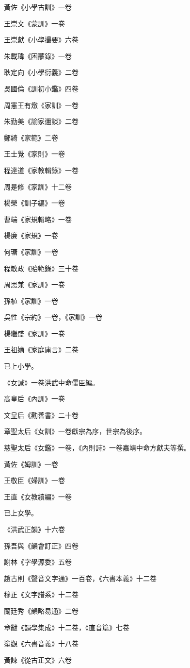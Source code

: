 黃佐《小學古訓》一卷

王崇文《蒙訓》一卷

王崇獻《小學撮要》六卷

朱載瑋《困蒙錄》一卷

耿定向《小學衍義》二卷

吳國倫《訓初小鑑》四卷

周憲王有燉《家訓》一卷

朱勤美《諭家邇談》二卷

鄭綺《家範》二卷

王士覺《家則》一卷

程達道《家教輯錄》一卷

周是修《家訓》十二卷

楊榮《訓子編》一卷

曹端《家規輯略》一卷

楊廉《家規》一卷

何瑭《家訓》一卷

程敏政《貽範錄》三十卷

周思兼《家訓》一卷

孫植《家訓》一卷

吳性《宗約》一卷，《家訓》一卷

楊繼盛《家訓》一卷

王祖嫡《家庭庸言》二卷

已上小學。

《女誡》一卷洪武中命儒臣編。

高皇后《內訓》一卷

文皇后《勸善書》二十卷

章聖太后《女訓》一卷獻宗為序，世宗為後序。

慈聖太后《女鑑》一卷，《內則詩》一卷嘉靖中命方獻夫等撰。

黃佐《姆訓》一卷

王敬臣《婦訓》一卷

王直《女教續編》一卷

已上女學。

《洪武正韻》十六卷

孫吾與《韻會訂正》四卷

謝林《字學源委》五卷

趙古則《聲音文字通》一百卷，《六書本義》十二卷

穆正《文字譜系》十二卷

蘭廷秀《韻略易通》二卷

章黻《韻學集成》十二卷，《直音篇》七卷

塗觀《六書音義》十八卷

黃諫《從古正文》六卷

